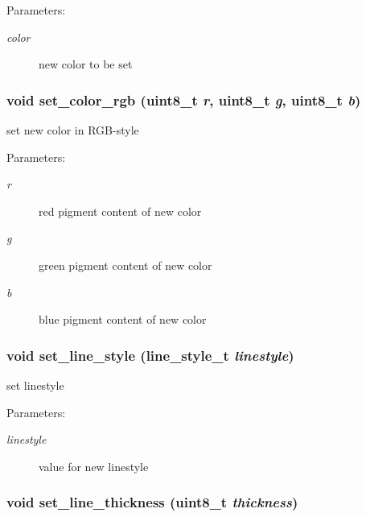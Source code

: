 \begin{Desc}
\item[Parameters:]
\begin{description}
\item[{\em color}]new color to be set \end{description}
\end{Desc}
\hypertarget{group__hgdi__api_ge97dbe5fd160d2b86ba22c067ada9f57}{
\subsubsection[{set\_\-color\_\-rgb}]{\setlength{\rightskip}{0pt plus 5cm}void set\_\-color\_\-rgb (uint8\_\-t {\em r}, \/  uint8\_\-t {\em g}, \/  uint8\_\-t {\em b})}}
\label{group__hgdi__api_ge97dbe5fd160d2b86ba22c067ada9f57}


set new color in RGB-style 

\begin{Desc}
\item[Parameters:]
\begin{description}
\item[{\em r}]red pigment content of new color \item[{\em g}]green pigment content of new color \item[{\em b}]blue pigment content of new color \end{description}
\end{Desc}
\hypertarget{group__hgdi__api_gb9b7e1a4efa87c1d2a8e6b34d49a3aeb}{
\subsubsection[{set\_\-line\_\-style}]{\setlength{\rightskip}{0pt plus 5cm}void set\_\-line\_\-style ({\bf line\_\-style\_\-t} {\em linestyle})}}
\label{group__hgdi__api_gb9b7e1a4efa87c1d2a8e6b34d49a3aeb}


set linestyle 

\begin{Desc}
\item[Parameters:]
\begin{description}
\item[{\em linestyle}]value for new linestyle \end{description}
\end{Desc}
\hypertarget{group__hgdi__api_g4e1ad4c71558a1855664187428409bba}{
\subsubsection[{set\_\-line\_\-thickness}]{\setlength{\rightskip}{0pt plus 5cm}void set\_\-line\_\-thickness (uint8\_\-t {\em thickness})}}
\label{group__hgdi__api_g4e1ad4c71558a1855664187428409bba}


